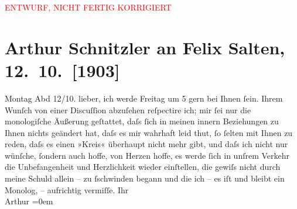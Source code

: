 
\begin{center}
            \textcolor{red}{ENTWURF, NICHT FERTIG KORRIGIERT}
                      \end{center}
            
         
         \renewcommand{\erwaehntePersonen}{Personen: Felix Salten}
         \renewcommand{\erwaehnteOrte}{Orte: Wien}
         \renewcommand{\erwaehnteWerke}{}
               \section[Arthur Schnitzler an Felix Salten, 12. 10. {[}1903{]}]{ Arthur Schnitzler an Felix Salten, 12. 10. {[}1903{]}}\nopagebreak{}\rehead{ }\begin{ledgroupsized}[t]{13cm}\normalsize\beginnumbering \toendnotes[C]{\smallbreak\pagebreak[2]} 
\pstart
           \raggedleft{}{\pb}Montag Abd 12/10. \pend
           \pstart
           lieber, ich werde Freitag um 5 gern bei
               Ihnen ſein. Ihrem Wunſch von einer Discuſſion abzuſehen reſpectire ich; mir ſei nur
               die monologiſche Äußerung geſtattet, daſs ſich in meinen innern Beziehungen zu Ihnen
               nichts geändert hat, daſs es mir wahrhaft leid thut, ſo ſelten mit Ihnen zu reden,
               daſs es {\pb}einen »Kreis« überhaupt nicht mehr
               gibt, und daſs ich nicht nur wünſche, ſondern auch hoffe,  von Herzen hoffe, es werde ſich in unſrem Verkehr die Unbefangenheit
               und Herzlichkeit wieder einſtellen, die gewiſs nicht durch meine Schuld allein – zu
               ſschwinden begann und die ich – es iſt {\pb}und
               bleibt ein Monolog, – aufrichtig vermiſſe. \pend
           \pstart
           Ihr {\\[\baselineskip]}\spacefill\mbox{Arthur}\pend
           \leftskip=0em{}
         
         \endnumbering{}\end{ledgroupsized}\begin{anhang}\end{anhang}\newcommand{\dateiname}{L02984}\newcommand{\titel}{Arthur Schnitzler an Felix Salten, 12. 10. [1903]}\newcommand{\editorInnen}{Martin Anton Müller und Laura Untner}
      